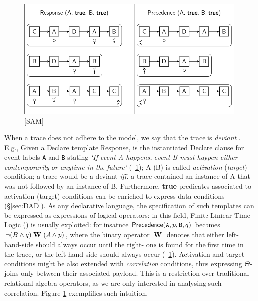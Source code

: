 \begin{figure}
	\centering
	\includegraphics[width=.7\textwidth]{images/ActivationTargetExample.png}
	\caption{[SAM]}\label{fig:comparison}
\end{figure}
When a trace does not adhere to the model, we say that the trace is \textit{deviant} \cite{bpm21}. %
E.g., Given a Declare template \textsf{Response},  is the instantiated Declare clause for event labels \texttt{A} and \texttt{B} stating \emph{`If event A happens, event B must happen either contemporarily or anytime in the future'} (\figurename~\ref{fig:comparison}); A (B) is called  \textit{activation} (\textit{target}) condition; a trace would be a deviant \emph{iff.} a trace contained an instance of A that was not followed by an instance of B.  {Furthermore, \textbf{true} predicates associated to activation (target) conditions can be enriched to express data conditions (\S\ref{sec:DAD}). As any declarative language, the specification of such templates can be expressed as expressions of logical operators: in this field, Finite Liniear Time Logic (\LTLf) is usually exploited:} for insatnce $\textsf{Precedence}(\texttt{A},p,\texttt{B},q)$ becomes ${\neg(B\wedge q)}\;\mathbf{W}\;{(A\wedge p)}$, %
{where the binary operator ${}\;\mathbf{W}\;{}$ denotes that either left-hand-side should always occur until the right- one is found for the first time in the trace, or the left-hand-side should always occur (\figurename~\ref{fig:comparison}).}{ Activation and target conditions might be also extended with \textit{correlation} conditions, thus expressing $\Theta$-joins only between their associated payload. This is a restriction over traditional relational algebra operators, as we are only interested in analysing such correlation. Figure \ref{fig:comparison} exemplifies such intuition.}
